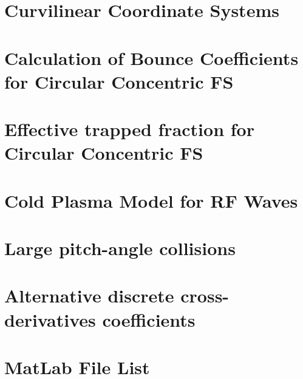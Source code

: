 \documentclass[11pt,a4paper]{report}
\begin{document}
\chapter{Curvilinear Coordinate Systems}


\chapter{Calculation of Bounce Coefficients for Circular Concentric FS}
%

\chapter{Effective trapped fraction for Circular Concentric FS}


\chapter{Cold Plasma Model for RF Waves}


\chapter{Large pitch-angle collisions}
%

\chapter{Alternative discrete cross-derivatives coefficients}


\chapter{MatLab File List}


\newpage


\end{document}

